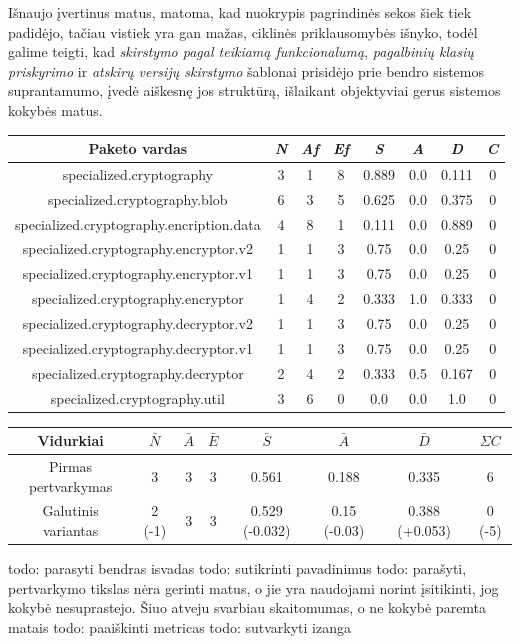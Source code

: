 Išnaujo įvertinus matus, matoma, kad nuokrypis pagrindinės sekos šiek tiek padidėjo, tačiau
vistiek yra gan mažas, ciklinės priklausomybės išnyko, todėl galime teigti, kad \textit{skirstymo pagal teikiamą funkcionalumą},
\textit{pagalbinių klasių priskyrimo} ir \textit{atskirų versijų skirstymo} šablonai prisidėjo prie bendro
sistemos suprantamumo, įvedė aiškesnę jos struktūrą, išlaikant objektyviai gerus sistemos kokybės matus.
\begin{center}
    \begin{tabular}{|c|c|c|c|c|c|c|c|}
        \hline
        Paketo vardas & \textit{N} & \textit{Af} & \textit{Ef} & \textit{S} & \textit{A} & \textit{D} & \textit{C} \\ [0.5ex]
        \hline\hline
        specialized.cryptography & 3 & 1 & 8 & 0.889 & 0.0 & 0.111 & 0 \\
        \hline
        specialized.cryptography.blob & 6 & 3 & 5 & 0.625 & 0.0 & 0.375 & 0 \\
        \hline
        specialized.cryptography.encription.data & 4 & 8 & 1 & 0.111 & 0.0 & 0.889 & 0 \\
        \hline
        specialized.cryptography.encryptor.v2 & 1 & 1 & 3 & 0.75 & 0.0 & 0.25 & 0 \\
        \hline
        specialized.cryptography.encryptor.v1 & 1 & 1 & 3 & 0.75 & 0.0 & 0.25 & 0 \\
        \hline
        specialized.cryptography.encryptor & 1 & 4 & 2 & 0.333 & 1.0 & 0.333 & 0 \\
        \hline
        specialized.cryptography.decryptor.v2 & 1 & 1 & 3 & 0.75 & 0.0 & 0.25 & 0 \\
        \hline
        specialized.cryptography.decryptor.v1 & 1 & 1 & 3 & 0.75 & 0.0 & 0.25 & 0 \\
        \hline
        specialized.cryptography.decryptor & 2 & 4 & 2 & 0.333 & 0.5 & 0.167 & 0 \\
        \hline
        specialized.cryptography.util & 3 & 6 & 0 & 0.0 & 0.0 & 1.0 & 0 \\
        \hline
    \end{tabular}
    \begin{tabular}{|c|c|c|c|c|c|c|c|}
        \hline
        Vidurkiai & $\bar{N}$ & $\bar{A}$ & $\bar{E}$ & $\bar{S}$ & $\bar{A}$ & $\bar{D}$ & $\Sigma C$ \\ [0.5ex]
        \hline\hline
        Pirmas pertvarkymas & 3 & 3 & 3 & 0.561 & 0.188 & 0.335 &  6 \\
        Galutinis variantas & \cellcolor{green!25} 2 (-1) & 3 & 3 & \cellcolor{green!25} 0.529 (-0.032) & \cellcolor{red!25} 0.15 (-0.03) & \cellcolor{red!25} 0.388 (+0.053) &  \cellcolor{green!25} 0 (-5) \\
        \hline
    \end{tabular}
\end{center}

todo: parasyti bendras isvadas
todo: sutikrinti pavadinimus
todo: parašyti, pertvarkymo tikslas nėra gerinti matus, o jie yra naudojami norint įsitikinti, jog kokybė nesuprastejo. Šiuo atveju svarbiau skaitomumas, o ne kokybė paremta matais
todo: paaiškinti metricas
todo: sutvarkyti izanga